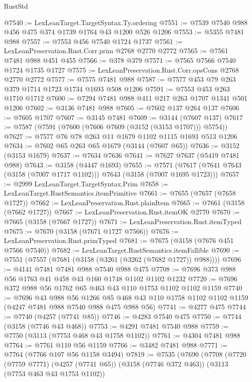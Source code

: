 \begin{lexlean}{RustStd}
\begin{coremodule}
{\begin{coremodule}
{{{{{{{{{{{{{{{{{{{{{{{{{{@7540 := LexLeanTarget.TargetSyntax.Ty.ordering
@7551 := @7539 @7540 @988 @456 @475 @374 @1739 @1764 @43 @1200 @526 @1206
@7553 := @5355 @7481 @988
@7557 := @7553 @456 @7540 @1724 @1737
@7561 := LexLeanPreservation.Rust.Corr.prim @2768 @2770 @2772
@7565 := @7561 @7481 @988 @451 @455
@7566 := @378 @379
@7571 := @7565 @7566 @7540 @1724 @1735 @1727
@7575 := LexLeanPreservation.Rust.Corr.opsCons @2768 @2770 @2772
@7577 := @7575 @7481 @988
@7587 := @7577 @453 @79 @263 @379 @1714 @1723 @1734 @1693 @508 @1206
@7591 := @7553 @453 @263 @1710 @1712
@7600 := @7294 @7481 @988 @411 @217 @263 @1707 @1341 @501 @1206
@7602 := @3136 @7481 @988
@7605 := @7602 @137 @264 @137
@7606 := @7605 @1707
@7607 := @3145 @7481
@7609 := @3144 (@7607 @137)
@7617 := @7587 (@7591 (@7600 (@7606 @7609 (@3152 (@3153 @1707))) @5754))
@7627 := @7577 @76 @78 @263 @11 @1679 @1102 @1115 @1693 @513 @1206
@7634 := @7602 @65 @263 @65 @1679 (@3144 (@7607 @65))
@7636 := @3152 (@3153 @1679)
@7637 := @7634 @7636
@7641 := @7627 @7637 (@5419 @7481 @988)
@7643 := @3158 (@4447 @1693)
@7655 := @7571 (@7617 (@7641 @7643 (@3158 (@7007 @1717 @1102))) @7643 (@3158 (@7007 @1695 @1723)))
@7657 := @2999 LexLeanTarget.TargetSyntax.Prim
@7658 := LexLeanTarget.RustSemantics.itemPrimitive
@7661 := @7655 (@7657 (@7658 @1727))
@7662 := LexLeanPreservation.Rust.plainItem
@7665 := @7661 (@3158 (@7662 @1727))
@7667 := LexLeanPreservation.Rust.itemOK @2770
@7670 := @7665 (@3158 (@7667 @1727))
@7671 := LexLeanPreservation.Rust.itemTyped
@7675 := @7670 (@3158 (@7671 @1727 @7566))
@7676 := LexLeanPreservation.Rust.primTyped
@7681 := @7675 (@3158 (@7676 @451 @7566 @7540))
@7682 := LexLeanTarget.RustSemantics.itemFallible
@7690 := @7551 (@7557 (@7681 (@3158 (@3261 (@3262 (@7682 @1727)) @988))))
@7696 := @4141 @7481 @7481 @988 @7540 @988 @475
@7708 := @7696 @373 @988 @56 @1763 @41 @458 @43 @160 @1748 @1102 @1102 @1232
@7720 := @7696 @372 @988 @56 @1762 @65 @463 @43 @110 @1753 @1102 @1102 @1159
@7740 := @7696
    @43
    @988
    @56
    @1266
    @85
    @468
    @43
    @110
    @1758
    @1102
    @1102
    @1159
    (@4247 @7481 @988 @7540 @988 @475 @988 @56)
@7741 := @4277 @475
@7744 := @7740 (@4257 (@7741 @85))
@7746 := @4283 @7540 @475
@7750 := @7744 (@3158 (@7746 @43 @468))
@7753 := @4291 @7481 @7540 @988
@7759 := @7750 (@3113 (@7753 @468 @43 @1758 @1102))
@7761 := @4304 @7481 @988
@7764 := @7761 @110 @56 @1159
@7766 := @3482 @7481 @988
@7771 := @7764 (@7766 @107 @56 @1158 @3494)
@7819 := @7535
    (@7690
      (@7708
        (@7720
          (@7759 @7771)
          (@4257 (@7741 @65))
          (@3158 (@7746 @372 @463))
          (@3113 (@7753 @463 @43 @1753 @1102))
}}}}}}}}}}}}}}}}}}}}}}}}}}
\end{coremodule}}
\end{coremodule}
\end{lexlean}
